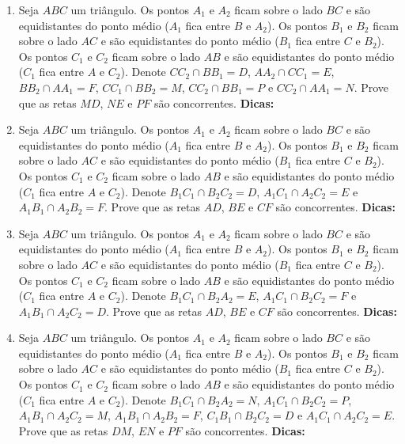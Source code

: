\documentclass{article}
\newcommand{\dica}{\textbf{Dicas:}}
\newcommand{\iniTri}{Seja $ABC$ um triângulo}
\begin{document}
\begin{multicols}{2}
\begin{enumerate}
    \item \iniTri. Os pontos $A_1$ e $A_2$ ficam sobre o lado $BC$ e são equidistantes do ponto médio ($A_1$ fica entre $B$ e $A_2$). Os pontos $B_1$ e $B_2$ ficam sobre o lado $AC$ e são equidistantes do ponto médio ($B_1$ fica entre $C$ e $B_2$). Os pontos $C_1$ e $C_2$ ficam sobre o lado $AB$ e são equidistantes do ponto médio ($C_1$ fica entre $A$ e $C_2$). Denote $CC_2\cap BB_1=D$, $AA_2\cap CC_1=E$, $BB_2\cap AA_1=F$, $CC_1\cap BB_2=M$, $CC_2\cap BB_1=P$ e $CC_2\cap AA_1=N$. Prove que as retas $MD$, $NE$ e $PF$ são concorrentes. \dica %
    
    \item \iniTri. Os pontos $A_1$ e $A_2$ ficam sobre o lado $BC$ e são equidistantes do ponto médio ($A_1$ fica entre $B$ e $A_2$). Os pontos $B_1$ e $B_2$ ficam sobre o lado $AC$ e são equidistantes do ponto médio ($B_1$ fica entre $C$ e $B_2$). Os pontos $C_1$ e $C_2$ ficam sobre o lado $AB$ e são equidistantes do ponto médio ($C_1$ fica entre $A$ e $C_2$). Denote $B_1C_1\cap B_2C_2=D$, $A_1C_1\cap A_2C_2=E$ e $A_1B_1\cap A_2B_2=F$. Prove que as retas $AD$, $BE$ e $CF$ são concorrentes. \dica %
    
    \item \iniTri. Os pontos $A_1$ e $A_2$ ficam sobre o lado $BC$ e são equidistantes do ponto médio ($A_1$ fica entre $B$ e $A_2$). Os pontos $B_1$ e $B_2$ ficam sobre o lado $AC$ e são equidistantes do ponto médio ($B_1$ fica entre $C$ e $B_2$). Os pontos $C_1$ e $C_2$ ficam sobre o lado $AB$ e são equidistantes do ponto médio ($C_1$ fica entre $A$ e $C_2$). Denote $B_1C_1\cap B_2A_2=E$, $A_1C_1\cap B_2C_2=F$ e $A_1B_1\cap A_2C_2=D$. Prove que as retas $AD$, $BE$ e $CF$ são concorrentes. \dica %
    
    \item \iniTri. Os pontos $A_1$ e $A_2$ ficam sobre o lado $BC$ e são equidistantes do ponto médio ($A_1$ fica entre $B$ e $A_2$). Os pontos $B_1$ e $B_2$ ficam sobre o lado $AC$ e são equidistantes do ponto médio ($B_1$ fica entre $C$ e $B_2$). Os pontos $C_1$ e $C_2$ ficam sobre o lado $AB$ e são equidistantes do ponto médio ($C_1$ fica entre $A$ e $C_2$). Denote $B_1C_1\cap B_2A_2=N$, $A_1C_1\cap B_2C_2=P$, $A_1B_1\cap A_2C_2=M$, $A_1B_1\cap A_2B_2=F$, $C_1B_1\cap B_2C_2=D$ e $A_1C_1\cap A_2C_2=E$. Prove que as retas $DM$, $EN$ e $PF$ são concorrentes. \dica %
    

\end{enumerate}
\end{multicols}
\end{document}
